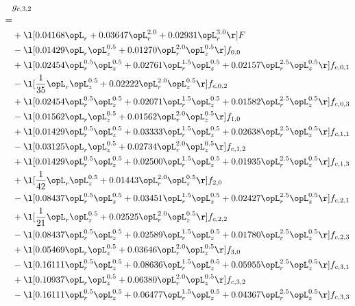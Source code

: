 \begin{alignat}{2} 
\label{eq:g_32_0} 
& g_{c,3,2} \nonumber \\ 
 = \\ 
& + \l[  0.04168 \opL_r +  0.03647 \opL_r^{2.0} +  0.02931 \opL_r^{3.0}  \r] F \nonumber \\ 
& - \l[  0.01429 \opL_r \opL_z^{0.5} +  0.01270 \opL_r^{2.0} \opL_z^{0.5}  \r] f_{0,0} \nonumber \\ 
& + \l[  0.02454 \opL_r^{0.5} \opL_z^{0.5} +  0.02761 \opL_r^{1.5} \opL_z^{0.5} +  0.02157 \opL_r^{2.5} \opL_z^{0.5}  \r] f_{c,0,1} \nonumber \\ 
& - \l[ \frac{1}{35} \opL_r \opL_z^{0.5} +  0.02222 \opL_r^{2.0} \opL_z^{0.5}  \r] f_{c,0,2} \nonumber \\ 
& + \l[  0.02454 \opL_r^{0.5} \opL_z^{0.5} +  0.02071 \opL_r^{1.5} \opL_z^{0.5} +  0.01582 \opL_r^{2.5} \opL_z^{0.5}  \r] f_{c,0,3} \nonumber \\ 
& - \l[  0.01562 \opL_r \opL_z^{0.5} +  0.01562 \opL_r^{2.0} \opL_z^{0.5}  \r] f_{1,0} \nonumber \\ 
& + \l[  0.01429 \opL_r^{0.5} \opL_z^{0.5} +  0.03333 \opL_r^{1.5} \opL_z^{0.5} +  0.02638 \opL_r^{2.5} \opL_z^{0.5}  \r] f_{c,1,1} \nonumber \\ 
& - \l[  0.03125 \opL_r \opL_z^{0.5} +  0.02734 \opL_r^{2.0} \opL_z^{0.5}  \r] f_{c,1,2} \nonumber \\ 
& + \l[  0.01429 \opL_r^{0.5} \opL_z^{0.5} +  0.02500 \opL_r^{1.5} \opL_z^{0.5} +  0.01935 \opL_r^{2.5} \opL_z^{0.5}  \r] f_{c,1,3} \nonumber \\ 
& + \l[ \frac{1}{42} \opL_r \opL_z^{0.5} +  0.01443 \opL_r^{2.0} \opL_z^{0.5}  \r] f_{2,0} \nonumber \\ 
& - \l[  0.08437 \opL_r^{0.5} \opL_z^{0.5} +  0.03451 \opL_r^{1.5} \opL_z^{0.5} +  0.02427 \opL_r^{2.5} \opL_z^{0.5}  \r] f_{c,2,1} \nonumber \\ 
& + \l[ \frac{1}{21} \opL_r \opL_z^{0.5} +  0.02525 \opL_r^{2.0} \opL_z^{0.5}  \r] f_{c,2,2} \nonumber \\ 
& - \l[  0.08437 \opL_r^{0.5} \opL_z^{0.5} +  0.02589 \opL_r^{1.5} \opL_z^{0.5} +  0.01780 \opL_r^{2.5} \opL_z^{0.5}  \r] f_{c,2,3} \nonumber \\ 
& + \l[  0.05469 \opL_r \opL_z^{0.5} +  0.03646 \opL_r^{2.0} \opL_z^{0.5}  \r] f_{3,0} \nonumber \\ 
& - \l[  0.16111 \opL_r^{0.5} \opL_z^{0.5} +  0.08636 \opL_r^{1.5} \opL_z^{0.5} +  0.05955 \opL_r^{2.5} \opL_z^{0.5}  \r] f_{c,3,1} \nonumber \\ 
& + \l[  0.10937 \opL_r \opL_z^{0.5} +  0.06380 \opL_r^{2.0} \opL_z^{0.5}  \r] f_{c,3,2} \nonumber \\ 
& - \l[  0.16111 \opL_r^{0.5} \opL_z^{0.5} +  0.06477 \opL_r^{1.5} \opL_z^{0.5} +  0.04367 \opL_r^{2.5} \opL_z^{0.5}  \r] f_{c,3,3} \nonumber \\ 
\end{alignat} 


